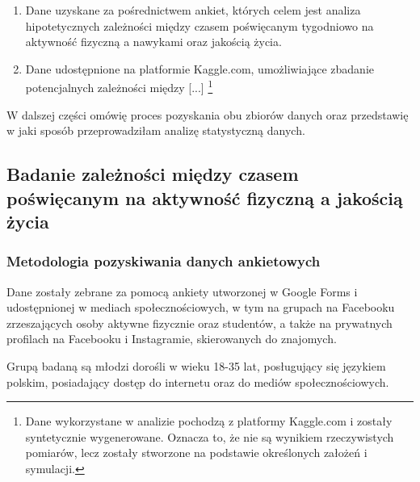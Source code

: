 \documentclass[12pt,a4paper]{article}
\begin{document}
\begin{enumerate}
    \item Dane uzyskane za pośrednictwem ankiet, których celem jest analiza hipotetycznych zależności między czasem poświęcanym tygodniowo na aktywność fizyczną a nawykami oraz jakością życia.
    \item Dane udostępnione na platformie Kaggle.com, umożliwiające zbadanie potencjalnych zależności między [...] \footnote{Dane wykorzystane w analizie pochodzą z platformy Kaggle.com i zostały syntetycznie wygenerowane. Oznacza to, że nie są wynikiem rzeczywistych pomiarów, lecz zostały stworzone na podstawie określonych założeń i symulacji.}
\end{enumerate}
W dalszej części omówię proces pozyskania obu zbiorów danych oraz przedstawię w jaki sposób przeprowadziłam analizę statystyczną danych.

\vspace{8mm}

\subsection{Badanie zależności między czasem poświęcanym na aktywność fizyczną a jakością życia}

\vspace{5mm}

\subsubsection{Metodologia pozyskiwania danych ankietowych}
Dane zostały zebrane za pomocą ankiety utworzonej w Google Forms i udostępnionej w mediach społecznościowych, w tym na grupach na Facebooku zrzeszających osoby aktywne fizycznie oraz studentów, a także na prywatnych profilach na Facebooku i Instagramie, skierowanych do znajomych.

\vspace{3mm}

Grupą badaną są młodzi dorośli w wieku 18-35 lat, posługujący się językiem polskim, posiadający dostęp do internetu oraz do mediów społecznościowych.
\end{document}

